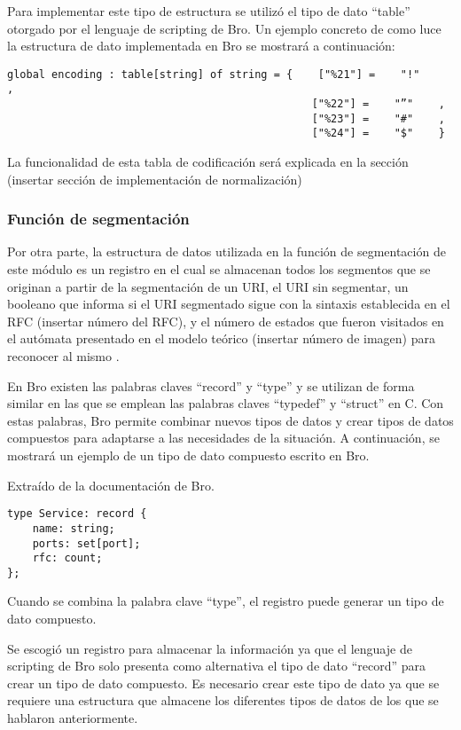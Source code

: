 Para implementar este tipo de estructura se utilizó el tipo de dato “table” otorgado por el lenguaje de scripting de Bro. Un ejemplo concreto de como luce la estructura de dato implementada en Bro se mostrará a continuación:

\begin{verbatim}
global encoding : table[string] of string = {    ["%21"] =    "!"     ,
                                                ["%22"] =    "”"    ,                                        
                                                ["%23"] =    "#"    ,
                                                ["%24"] =    "$"    }
\end{verbatim}

La funcionalidad de esta tabla de codificación será explicada en la sección (insertar sección de implementación de normalización)

\subsubsection{Función de segmentación}
\label{sssec:estructuraSegmentacion}

Por otra parte, la estructura de datos utilizada en la función de segmentación de este módulo es un registro en el cual se almacenan todos los segmentos que se originan a partir de la segmentación de un URI, el URI sin segmentar, un booleano que informa si el URI segmentado sigue con la sintaxis establecida en el RFC (insertar número del RFC), y el número de estados que fueron visitados en el autómata presentado en el modelo teórico (insertar número de imagen) para reconocer al mismo .

En Bro existen las palabras claves “record” y “type” y se utilizan de forma similar en las que se emplean las palabras claves “typedef” y “struct” en C. Con estas palabras, Bro permite combinar nuevos tipos de datos y crear tipos de datos compuestos para adaptarse a las necesidades de la situación. A continuación, se mostrará un ejemplo de un tipo de dato compuesto escrito en Bro.

Extraído de la documentación de Bro.

\begin{verbatim}
type Service: record {
    name: string;
    ports: set[port];
    rfc: count;
};
\end{verbatim}
Cuando se combina la palabra clave “type”, el registro puede generar un tipo de dato compuesto.

Se escogió un registro para almacenar la información ya que el lenguaje de scripting de Bro solo presenta como alternativa el tipo de dato “record” para crear un tipo de dato compuesto. Es necesario crear este tipo de dato ya que se requiere una estructura que almacene los diferentes tipos de datos de los que se hablaron anteriormente. 

